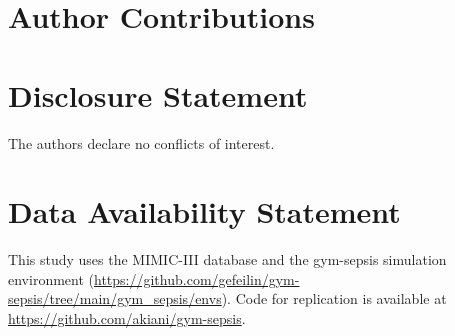 \documentclass[11pt]{article}
\begin{document}





















\section{Author Contributions}



\section{Disclosure Statement}

The authors declare no conflicts of interest.

\section{Data Availability Statement}

This study uses the MIMIC-III database \citep{johnson2016mimic3} and the gym-sepsis simulation environment (\url{https://github.com/gefeilin/gym-sepsis/tree/main/gym_sepsis/envs}). Code for replication is available at \url{https://github.com/akiani/gym-sepsis}.




\end{document}
